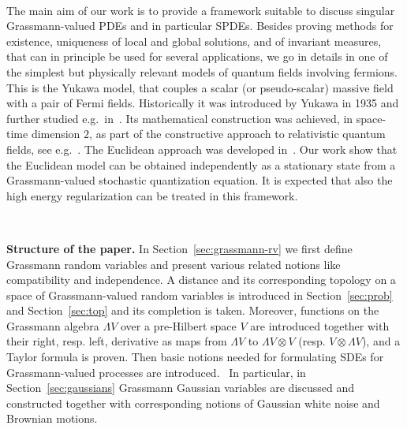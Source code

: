 \documentclass{article}
\newcommand{\tmtextbf}[1]{{\bfseries{#1}}}
\begin{document}
\

The main aim of our work is to provide a framework suitable to discuss
singular Grassmann-valued PDEs and in particular SPDEs. Besides proving
methods for existence, uniqueness of local and global solutions, and of
invariant measures, that can in principle be used for several applications, we
go in details in one of the simplest but physically relevant models of quantum
fields involving fermions. This is the Yukawa model, that couples a scalar (or
pseudo-scalar) massive field with a pair of Fermi fields. Historically it was
introduced by Yukawa in 1935 and further studied
e.g.~in~{\cite{matthews_propagators_1955}}. Its mathematical construction was
achieved, in space-time dimension $2$, as part of the constructive approach to
relativistic quantum fields, see
e.g.~{\cite{lanford_iii_construction_1966,mcbryan_volume_1975,glimm_quantum_1985,dimock_estimates_1972,McBryan1975,Magnen1976,Magnen1978,Federbush1971,Jaffe1971}}.
The Euclidean approach was developed
in~{\cite{osterwalder_euclidean_1973-2,seiler_schwinger_1975,seiler_bounds_1975,Gross_Euclidean_1976,williams_euclidean_1974}}.
Our work show that the Euclidean model can be obtained independently as a
stationary state from a Grassmann-valued stochastic quantization equation. It
is expected that also the high energy regularization can be treated in this
framework.

\

{\noindent}\tmtextbf{Structure of the paper.} In
Section~\ref{sec:grassmann-rv} we first define Grassmann random variables and
present various related notions like compatibility and independence. A
distance and its corresponding topology on a space of Grassmann-valued random
variables is introduced in Section~\ref{sec:prob} and Section~\ref{sec:top}
and its completion is taken. Moreover, functions on the Grassmann algebra
$\Lambda V$ over a pre-Hilbert space $V$ are introduced together with their
right, resp. left, derivative as maps from $\Lambda V$ to $\Lambda V \otimes
V$ (resp. $V \otimes \Lambda V$), and a Taylor formula is proven. Then basic
notions needed for formulating SDEs for Grassmann-valued processes are
introduced. \ In particular, in Section~\ref{sec:gaussians} Grassmann Gaussian
variables are discussed and constructed together with corresponding notions of
Gaussian white noise and Brownian motions.
\end{document}
